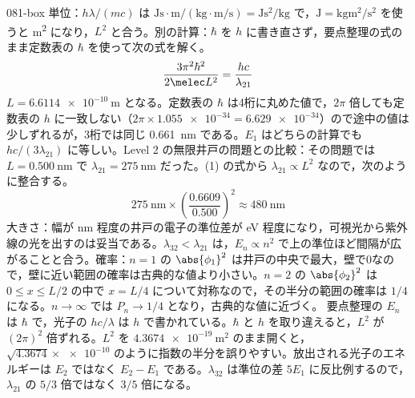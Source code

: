 \documentclass[uplatex,dvipdfmx,a4paper,11pt]{jsarticle}
\begin{document}
\begin{kaisetsu}{081-box}
\kenzan 単位：$h\lambda/(mc)$ は $\unit{\joule\second}\cdot\unit{\metre}/(\unit{\kilogram}\cdot\unit{\metre\per\second})=\unit{\joule\second\squared\per\kilogram}$ で，$\unit{\joule}=\unit{\kilogram\metre\squared\per\second\squared}$ を使うと \unit{\metre\squared} になり，$L^{2}$ と合う。別の計算：$\hbar$ を $h$ に書き直さず，要点整理の式のまま定数表の $\hbar$ を使って次の式を解く。
\[ \frac{3\pi^{2}\hbar^{2}}{2\melec L^{2}}=\frac{hc}{\lambda_{21}} \]
$L=\qty{6.6114e-10}{\metre}$ となる。定数表の $\hbar$ は4桁に丸めた値で，$2\pi$ 倍しても定数表の $h$ に一致しない（$2\pi\times\num{1.055e-34}=\num{6.629e-34}$）ので途中の値は少しずれるが，3桁では同じ \qty{0.661}{\nano\metre} である。$E_{1}$ はどちらの計算でも $hc/(3\lambda_{21})$ に等しい。Level 2 の無限井戸の問題との比較：その問題では $L=\qty{0.500}{\nano\metre}$ で $\lambda_{21}=\qty{275}{\nano\metre}$ だった。(1) の式から $\lambda_{21}\propto L^{2}$ なので，次のように整合する。
\[ \qty{275}{\nano\metre}\times\left(\frac{\num{0.6609}}{\num{0.500}}\right)^{2}\approx\qty{480}{\nano\metre} \]
大きさ：幅が \unit{\nano\metre} 程度の井戸の電子の準位差が \unit{\electronvolt} 程度になり，可視光から紫外線の光を出すのは妥当である。$\lambda_{32}<\lambda_{21}$ は，$E_{n}\propto n^{2}$ で上の準位ほど間隔が広がることと合う。確率：$n=1$ の $\abs{\phi_{1}}^{2}$ は井戸の中央で最大，壁で0なので，壁に近い範囲の確率は古典的な値より小さい。$n=2$ の $\abs{\phi_{2}}^{2}$ は $0\le x\le L/2$ の中で $x=L/4$ について対称なので，その半分の範囲の確率は $1/4$ になる。$n\to\infty$ では $P_{n}\to 1/4$ となり，古典的な値に近づく。
\tsumazuki 要点整理の $E_{n}$ は $\hbar$ で，光子の $hc/\lambda$ は $h$ で書かれている。$\hbar$ と $h$ を取り違えると，$L^{2}$ が $(2\pi)^{2}$ 倍ずれる。$L^{2}$ を $\qty{4.3674e-19}{\metre\squared}$ のまま開くと，$\sqrt{\num{4.3674}}\times\num{e-10}$ のように指数の半分を誤りやすい。放出される光子のエネルギーは $E_{2}$ ではなく $E_{2}-E_{1}$ である。$\lambda_{32}$ は準位の差 $5E_{1}$ に反比例するので，$\lambda_{21}$ の $5/3$ 倍ではなく $3/5$ 倍になる。
\end{kaisetsu}
\end{document}
